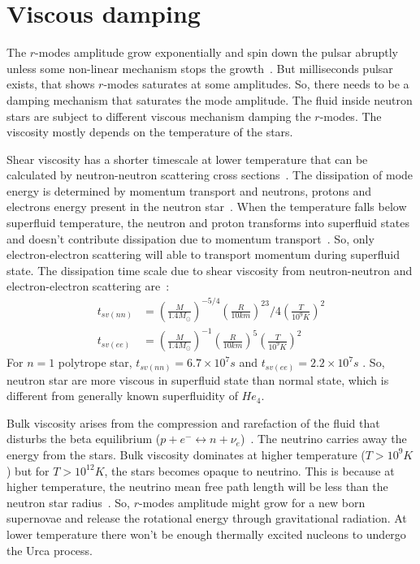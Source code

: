 \documentclass{ttuthes2007}
\begin{document}
\section{Viscous damping}
The $r$-modes amplitude grow exponentially and spin down the pulsar abruptly
unless some non-linear mechanism stops the growth~\cite{}. But milliseconds
pulsar exists, that shows $r$-modes saturates at some amplitudes. So, there
needs to be a damping mechanism that saturates the mode amplitude.  The fluid
inside neutron stars are subject to different viscous mechanism damping the
$r$-modes. The viscosity mostly depends on the temperature of the stars.

Shear viscosity has a shorter timescale at lower temperature that can be
calculated by neutron-neutron scattering cross sections~\cite{Owen_2000}. The dissipation
of mode energy is determined by momentum transport and neutrons, protons and
electrons energy present in the neutron star~\cite{1987ApJ...314..234C}. When
the temperature falls below superfluid temperature, the neutron and proton
transforms into superfluid states and doesn't contribute dissipation due to
momentum transport~\cite{1987ApJ...314..234C}. So, only electron-electron
scattering will able to transport momentum during superfluid state. The
dissipation time scale due to shear viscosity from neutron-neutron and
electron-electron scattering are~\cite{ANDERSSON_2001}:
\begin{align*}
t_{sv(nn)}&=\left(\frac{M}{1.4M_\odot}\right)^{-5/4}\left(\frac{R}{10km}\right)^23/4\left(\frac{T}{10^9K}\right)^2\\
t_{sv(ee)}&=\left(\frac{M}{1.4M_\odot}\right)^{-1}\left(\frac{R}{10km}\right)^5\left(\frac{T}{10^9K}\right)^2
\end{align*}
For $n=1$ polytrope star, $t_{sv(nn)}=6.7\times 10^7 s$ and
$t_{sv(ee)}=2.2\times 10^7 s$ . So, neutron star are more viscous in superfluid
state than normal state, which is different from generally known superfluidity
of $He_4$.~\cite{1987ApJ...314..234C}

Bulk viscosity arises from the compression and rarefaction of the fluid that
disturbs the beta equilibrium ($p+e^- \leftrightarrow n +
\nu_e$)~\cite{Owen_2000}. The neutrino carries away the energy from the stars.
Bulk viscosity dominates at higher temperature ($T>10^9 K$) but for $T > 10^{12}
K$, the stars becomes opaque to neutrino. This is because at higher temperature,
the neutrino mean free path length will be less  than the neutron star
radius~\cite{page2013stellar}. So, $r$-modes amplitude might grow
for a new born supernovae and release the rotational energy through
gravitational radiation. At lower temperature there won't be enough thermally
excited nucleons to undergo the Urca process.
\end{document}
